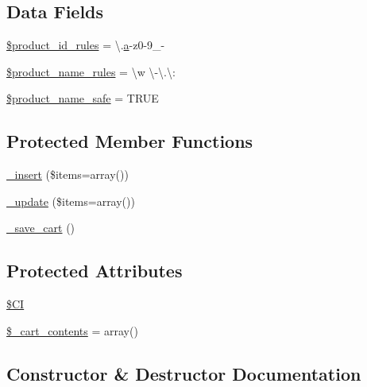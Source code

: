 \subsection*{Data Fields}
\begin{DoxyCompactItemize}
\item 
\hyperlink{class_c_i___cart_aef9fb0bb2a9ab37008d77ed80b7b122b}{\$product\+\_\+id\+\_\+rules} = \textquotesingle{}\textbackslash{}.\hyperlink{assets_2js_2bootstrap_8min_8js_a1f5870dcf487187f13d5fd328ed9e6e7}{a}-\/z0-\/9\+\_\+-\/\textquotesingle{}
\item 
\hyperlink{class_c_i___cart_afdc2e791be5e676e94580a0d9ed63ebf}{\$product\+\_\+name\+\_\+rules} = \textquotesingle{}\textbackslash{}w \textbackslash{}-\/\textbackslash{}.\textbackslash{}\+:\textquotesingle{}
\item 
\hyperlink{class_c_i___cart_afefced563284b97869b3d35053857362}{\$product\+\_\+name\+\_\+safe} = T\+R\+U\+E
\end{DoxyCompactItemize}
\subsection*{Protected Member Functions}
\begin{DoxyCompactItemize}
\item 
\hyperlink{class_c_i___cart_a55d27979573b7d46bdf774f247c15b07}{\+\_\+insert} (\$items=array())
\item 
\hyperlink{class_c_i___cart_ac7b19afff2357d4b9e926ee2df1f3e65}{\+\_\+update} (\$items=array())
\item 
\hyperlink{class_c_i___cart_abaa559f3e9e7f8ad933f19165fb61083}{\+\_\+save\+\_\+cart} ()
\end{DoxyCompactItemize}
\subsection*{Protected Attributes}
\begin{DoxyCompactItemize}
\item 
\hyperlink{class_c_i___cart_ae0314d046ddf7fcfaec03222977427d3}{\$\+C\+I}
\item 
\hyperlink{class_c_i___cart_a93aff4174af6004d8cc7a51bf0c59632}{\$\+\_\+cart\+\_\+contents} = array()
\end{DoxyCompactItemize}


\subsection{Constructor \& Destructor Documentation}
\hypertarget{class_c_i___cart_a568ecdb0d73d2a870f33189739922a50}{}
